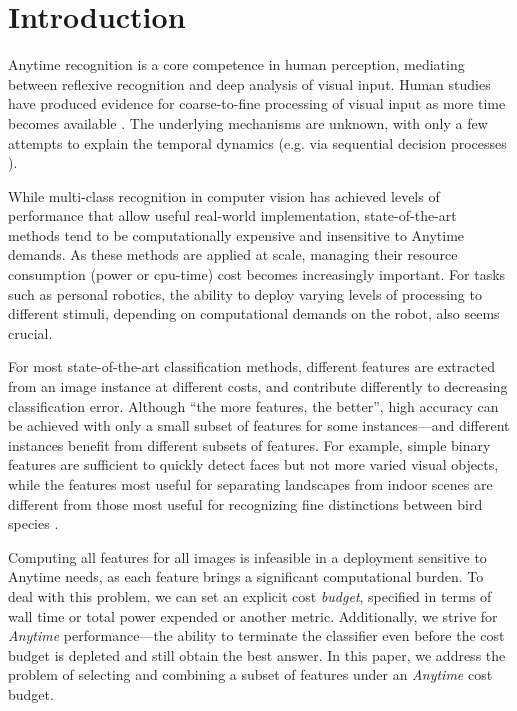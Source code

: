 \vspace{-1.5em}
\section{Introduction}

Anytime recognition is a core competence in human perception, mediating between reflexive recognition and deep analysis of visual input.
Human studies have produced evidence for coarse-to-fine processing of visual input as more time becomes available \cite{Fei-Fei-Vision-2007,mace09plos}.
The underlying mechanisms are unknown, with only a few attempts to explain the temporal dynamics (e.g. via sequential decision processes \cite{hegde08neuro}).

While multi-class recognition in computer vision has achieved levels of performance that allow useful real-world implementation, state-of-the-art methods tend to be computationally expensive and insensitive to Anytime demands.
As these methods are applied at scale, managing their resource consumption (power or cpu-time) cost becomes increasingly important.
For tasks such as personal robotics, the ability to deploy varying levels of processing to different stimuli, depending on computational demands on the robot, also seems crucial.

For most state-of-the-art classification methods, different features are extracted from an image instance at different costs, and contribute differently to decreasing classification error.
Although ``the more features, the better'', high accuracy can be achieved with only a small subset of features for some instances---and different instances benefit from different subsets of features.
For example, simple binary features are sufficient to quickly detect faces \cite{Viola2004} but not more varied visual objects, while the features most useful for separating landscapes from indoor scenes \cite{Xiao-CVPR-2010} are different from those most useful for recognizing fine distinctions between bird species \cite{Farrell-ICCV-2011}.

Computing all features for all images is infeasible in a deployment sensitive to Anytime needs, as each feature brings a significant computational burden.
To deal with this problem, we can set an explicit cost \emph{budget}, specified in terms of wall time or total power expended or another metric.
Additionally, we strive for \emph{Anytime} performance---the ability to terminate the classifier even before the cost budget is depleted and still obtain the best answer.
In this paper, we address the problem of selecting and combining a subset of features under an \emph{Anytime} cost budget.

